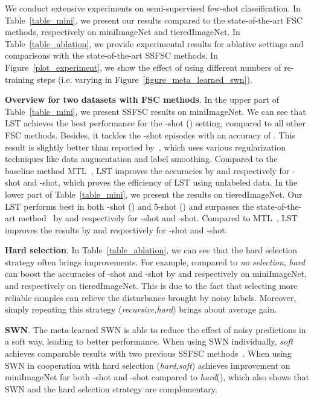 \documentclass{article}
\newcommand{\myparagraph}[1]{\vspace{0.1em}\noindent\textbf{#1}}
\begin{document}
We conduct extensive experiments on semi-supervised few-shot classification. In Table~\ref{table_mini}, we present our results compared to the state-of-the-art FSC methods, respectively on miniImageNet and tieredImageNet. In Table~\ref{table_ablation}, we provide experimental results for ablative settings and comparisons with the state-of-the-art SSFSC methods. In Figure~\ref{plot_experiment}, we show the effect of using different numbers of re-training steps (i.e. varying  in Figure~\ref{figure_meta_learned_swn}).

\myparagraph{Overview for two datasets with FSC methods}. 
In the upper part of Table~\ref{table_mini}, we present SSFSC results on miniImageNet. We can see that LST achieves the best performance for the -shot () setting, compared to all other FSC methods. Besides, it tackles the -shot episodes with an accuracy of . This result is slightly better than  reported by~\cite{LeeCVPR19svm}, which uses various regularization techniques like data augmentation and label smoothing.
Compared to the baseline method MTL~\cite{SunCVPR2019}, LST improves the accuracies by  and  respectively for -shot and -shot, which proves the efficiency of LST using unlabeled data. In the lower part of Table~\ref{table_mini}, we present the results on tieredImageNet. Our LST performs best in both -shot () and 5-shot () and surpasses the state-of-the-art method~\cite{LeeCVPR19svm} by  and  respectively for -shot and -shot. 
Compared to MTL~\cite{SunCVPR2019}, LST improves the results by  and  respectively for -shot and -shot.

\myparagraph{Hard selection}. In Table~\ref{table_ablation}, we can see that the hard selection strategy often brings improvements. For example, compared to \emph{no selection}, \emph{hard} can boost the accuracies of -shot and -shot by  and  respectively on miniImageNet,  and  respectively on tieredImageNet. This is due to the fact that selecting more reliable samples can relieve the disturbance brought by noisy labels. 
Moreover, simply repeating this strategy (\emph{recursive,hard}) brings about  average gain.


\myparagraph{SWN}. The meta-learned SWN is able to reduce the effect of noisy predictions in a soft way, leading to better performance. When using SWN individually, \emph{soft} achieves comparable results with two previous SSFSC methods~\cite{RenICLR2018_semisupervised, LiuICLR2019transductive}. When using SWN in cooperation with hard selection (\emph{hard,soft}) achieves  improvement on miniImageNet for both -shot and -shot compared to \emph{hard}(), which also shows that SWN and the hard selection strategy are complementary.
\end{document}
